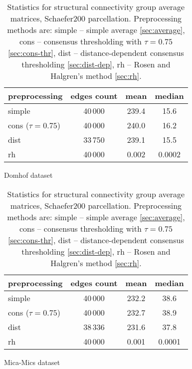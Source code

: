 \begin{table}
\begin{subtable}{\textwidth}
    \centering
    \begin{tabular}{l | c | c | c }
        preprocessing & edges count & mean	& median\\
        \midrule
        simple             &40\,000  &239.4  &15.6	\\
        cons ($\tau=0.75$) &40\,000	&240.0	&16.2	\\
        dist               &33\,750	&239.1	&15.5	\\
        rh                 &40\,000	&0.002	&0.0002 \\
    \end{tabular}
    \caption{Domhof dataset}
    \label{tab:sc_stats}
\end{subtable}

\bigskip

\begin{subtable}{\textwidth}
    \centering
    \begin{tabular}{l | c | c | c }
        preprocessing & edges count & mean	& median\\
        \midrule
        simple             &40\,000  &232.2	&38.6	\\
        cons ($\tau=0.75$) &40\,000	&232.7	&38.9	\\
        dist               &38\,336	&231.6	&37.8	\\
        rh                 &40\,000	&0.001	&0.0001 \\
    \end{tabular}
    \caption{Mica-Mics dataset}
    \label{tab:sc_stats}
\end{subtable}
    \caption[Statistics for structural connectivity group average matrices]{Statistics for structural connectivity group average matrices, Schaefer200 parcellation. Preprocessing methods are: simple -- simple average \ref{sec:average}, cons -- consensus thresholding with $\tau=0.75$ \ref{sec:cons-thr}, dist -- distance-dependent consensus thresholding \ref{sec:dist-dep}, rh -- Rosen and Halgren's method \ref{sec:rh}. }
\end{table}

\begin{figure}[h!]
  \begin{center}
  \end{center}
  \caption[\TODO]{\TODO}
  \label{fig:sc_matrices}
\end{figure}

